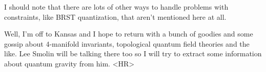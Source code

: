 I should note that there are lots of other ways to handle problems with
constraints, like BRST quantization, that aren't mentioned here at all.

Well, I'm off to Kansas and I hope to return with a bunch of goodies and
some gossip about 4-manifold invariants, topological quantum field
theories and the like.  Lee Smolin will be talking there too so I will
try to extract some information about quantum gravity from him.
<HR>



